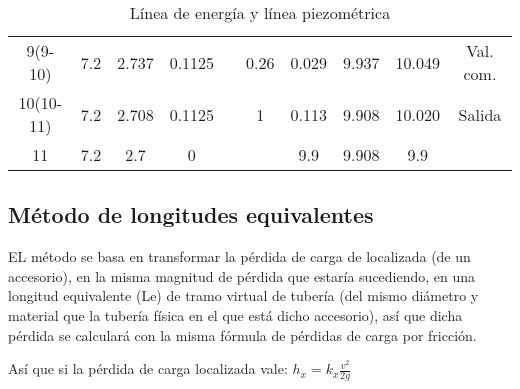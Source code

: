 \begin{table}[h!]
\begin{tabular}{@{}cccccccccc@{}}
    9(9-10)                                              & 7.2      & 2.737                                                                 & 0.1125                                                              &                                                      & 0.26          & 0.029                                                    & 9.937     & 10.049                                                  & Val. com. \\
    10(10-11)                                            & 7.2      & 2.708                                                                 & 0.1125                                                              &                                                      & 1             & 0.113                                                    & 9.908     & 10.020                                                  & Salida    \\
    11                                                   & 7.2      & 2.7                                                                   & 0                                                                   &                                                      &               & 9.9                                                      & 9.908     & 9.9                                                     &           \\ \bottomrule
    \end{tabular}
    \caption{Línea de energía y línea piezométrica}
    \label{tabhb26}
\end{table}

\subsection{Método de longitudes equivalentes}

EL método se basa en transformar la pérdida de carga de localizada (de un accesorio), en la misma magnitud de pérdida que estaría sucediendo, en una longitud equivalente (Le) de tramo virtual de tubería (del mismo diámetro y material que la tubería física en el que está dicho accesorio), así que dicha pérdida se calculará con la misma fórmula de pérdidas de carga por fricción.

Así que si la pérdida de carga localizada vale: $h_x=k_x\frac{v^2}{2g}$

